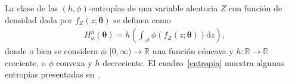 \documentclass[11pt]{article}
\begin{document}
%
%


La clase de las $(h,\phi)$-entropías de una variable aleatoria $Z$ con función de densidad dada por $f_{Z}(z ; \boldsymbol{\theta})$ se definen como
\begin{align*}
H_{\phi}^{h}(\boldsymbol{\theta})=h\left(\int_{\mathcal{A}} \phi\left(f_{Z}(z ; \boldsymbol{\theta})\right) \mathrm{d} z\right),
\end{align*}
donde o bien se considera $\phi\colon [0, \infty) \rightarrow \mathbb{R}$ una función cóncava y $h\colon \mathbb{R} \rightarrow \mathbb{R}$ creciente, o $\phi$ convexa y $h$ decreciente. 
El cuadro~\ref{entropia} muestra algunas entropías presentadas en~\cite{Frery2019}.
\end{document}
